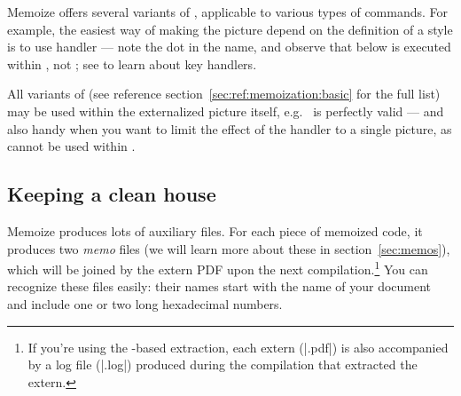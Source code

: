 \documentclass[a4paper,11pt]{article}
\begin{document}
Memoize offers several variants of , applicable to
various types of commands.  For example, the easiest way of making the picture
depend on the definition of a  style is to use handler
 --- note the dot in the name, and
observe that  below is executed within
, not ; see  to learn about key
handlers.



All variants of  (see reference
section~\ref{sec:ref:memoization:basic} for the full list) may be used within
the externalized picture itself, e.g.\  is perfectly
valid --- and also handy when you want to limit the effect of the handler to a
single picture, as  cannot be used within
.



\subsection{Keeping a clean house}
\label{sec:tut:memodir}

Memoize produces lots of auxiliary files.  For each piece of memoized code, it
produces two \emph{memo} files (we will learn more about these in
section~\ref{sec:memos}), which will be joined by the extern PDF upon the next
compilation.\footnote{If you're using the -based extraction, each
  extern (|.pdf|) is also accompanied by a log file (|.log|) produced during
  the compilation that extracted the extern.} You can recognize these files
easily: their names start with the name of your document and include one or two
long hexadecimal numbers.
\end{document}

